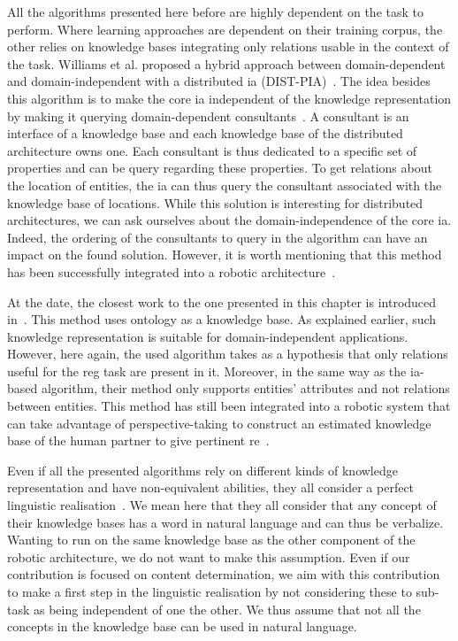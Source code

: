 All the algorithms presented here before are highly dependent on the task to perform. Where learning approaches are dependent on their training corpus, the other relies on knowledge bases integrating only relations usable in the context of the task. Williams et al. proposed a hybrid approach between domain-dependent and domain-independent with a distributed \acrlong{ia} (DIST-PIA)~\cite{williams_2017_referring}. The idea besides this algorithm is to make the core \acrlong{ia} independent of the knowledge representation by making it querying domain-dependent consultants~\cite{williams_2016_framework}. A consultant is an interface of a knowledge base and each knowledge base of the distributed architecture owns one. Each consultant is thus dedicated to a specific set of properties and can be query regarding these properties. To get relations about the location of entities, the \acrlong{ia} can thus query the consultant associated with the knowledge base of locations. While this solution is interesting for distributed architectures, we can ask ourselves about the domain-independence of the core \acrlong{ia}. Indeed, the ordering of the consultants to query in the algorithm can have an impact on the found solution. However, it is worth mentioning that this method has been successfully integrated into a robotic architecture~\cite{williams_2019_dempster}.

At the date, the closest work to the one presented in this chapter is introduced in~\cite{ros_2010_which}. This method uses ontology as a knowledge base. As explained earlier, such knowledge representation is suitable for domain-independent applications. However, here again, the used algorithm takes as a hypothesis that only relations useful for the \acrshort{reg} task are present in it. Moreover, in the same way as the \acrshort{ia}-based algorithm, their method only supports entities' attributes and not relations between entities. This method has still been integrated into a robotic system that can take advantage of perspective-taking to construct an estimated knowledge base of the human partner to give pertinent \acrshort{re}~\cite{lemaignan_2011_grounding}.

Even if all the presented algorithms rely on different kinds of knowledge representation and have non-equivalent abilities, they all consider a perfect linguistic realisation~\cite{krahmer_2012_computational}. We mean here that they all consider that any concept of their knowledge bases has a word in natural language and can thus be verbalize. Wanting to run on the same knowledge base as the other component of the robotic architecture, we do not want to make this assumption. Even if our contribution is focused on content determination, we aim with this contribution to make a first step in the linguistic realisation by not considering these to sub-task as being independent of one the other. We thus assume that not all the concepts in the knowledge base can be used in natural language.

